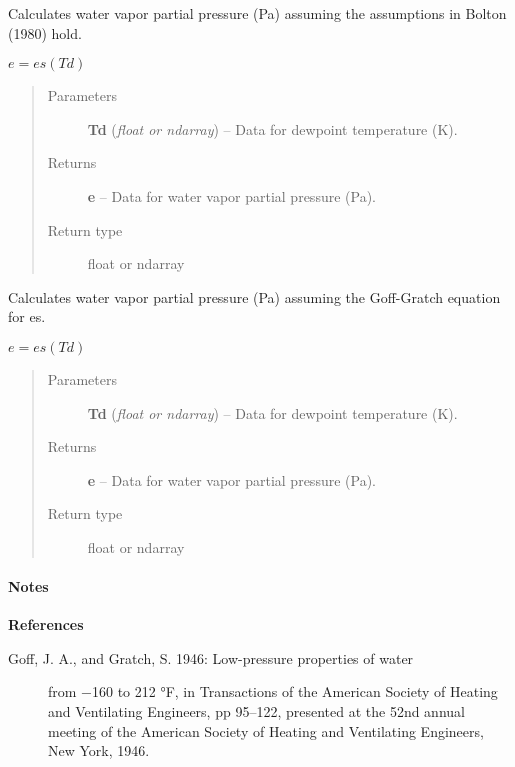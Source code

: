 \documentclass[letterpaper,10pt,english]{sphinxmanual}
\begin{document}

\begin{fulllineitems}
\label{atmos:atmos.equations.e_from_Td_Bolton}
Calculates water vapor partial pressure (Pa) assuming the assumptions in Bolton
(1980) hold.

\(e = es(Td)\)
\begin{quote}\begin{description}
\item[{Parameters}] \leavevmode
\textbf{Td} (\emph{float or ndarray}) -- Data for dewpoint temperature (K).

\item[{Returns}] \leavevmode
\textbf{e} --
Data for water vapor partial pressure (Pa).

\item[{Return type}] \leavevmode
float or ndarray

\end{description}\end{quote}

\end{fulllineitems}


\begin{fulllineitems}
\label{atmos:atmos.equations.e_from_Td_Goff_Gratch}
Calculates water vapor partial pressure (Pa) assuming the Goff-Gratch equation
for es.

\(e = es(Td)\)
\begin{quote}\begin{description}
\item[{Parameters}] \leavevmode
\textbf{Td} (\emph{float or ndarray}) -- Data for dewpoint temperature (K).

\item[{Returns}] \leavevmode
\textbf{e} --
Data for water vapor partial pressure (Pa).

\item[{Return type}] \leavevmode
float or ndarray

\end{description}\end{quote}
\paragraph{Notes}

\textbf{References}
\begin{description}
\item[{Goff, J. A., and Gratch, S. 1946: Low-pressure properties of water}] \leavevmode
from −160 to 212 °F, in Transactions of the American Society of
Heating and Ventilating Engineers, pp 95–122, presented at the
52nd annual meeting of the American Society of Heating and
Ventilating Engineers, New York, 1946.

\end{description}

\end{fulllineitems}
\end{document}
